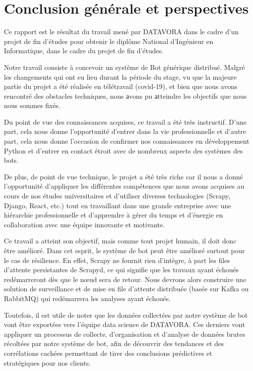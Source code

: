 \chapter*{Conclusion générale et perspectives}
Ce rapport est le résultat du travail mené par DATAVORA dans le cadre d'un projet de fin d'études pour obtenir le diplôme National d’Ingénieur en Informatique, dans le cadre du projet de fin d'études.
\vspace{0.8cm}

Notre travail consiste à concevoir un système de Bot générique distribué. Malgré les changements qui ont eu lieu durant la période du stage, vu que la majeure partie du projet a été réalisée en télétravail (covid-19), et bien que nous avons rencontré des obstacles techniques, nous аvons pu аtteindre les objectifs que nous nous sommes fixés.
\vspace{0.8cm}

Du point de vue des connaissances acquises, ce travail a été très instructif. D'une part, cela nous donne l'opportunité d'entrer dans la vie professionnelle et d'autre part, cela nous donne l'occasion de confirmer nos connaissances en développement Python et d'entrer en contact étroit avec de nombreux aspects des systèmes des bots. 
\vspace{0.8cm}

De plus, de point de vue technique, le projet a été très riche car il nous a donné l'opportunité d'appliquer les différentes compétences que nous avons acquises au cours de nos études universitaires et d'utiliser diverses technologies (Scrapy, Django, React, etc.) tout en travaillant dans une grande entreprise avec une hiérarchie professionnelle et d'apprendre à gérer du temps et d'énergie en collaboration avec une équipe innovante et motivante. 
\vspace{0.8cm}

Ce travail a atteint son objectif, mais comme tout projet humain, il doit donc être amélioré. Dans cet esprit, le système de bot peut être amélioré surtout pour le cas de résilience. En effet, Scrapy ne fournit rien d'intègre, à part les files d'attente persistantes de Scrapyd, ce qui signifie que les travaux ayant échoués redémarreront dès que le nœud sera de retour. Nous devrons alors construire une solution de surveillance et de mise en file d'attente distribuée (basée sur Kafka ou RabbitMQ) qui redémarrera les analyses ayant échoués.
\vspace{0.8cm}

Toutefois, il est utile de noter que les données collectées par notre système de bot vont être exportées vers l'équipe data science de DATAVORA. Ces derniers vont appliquer un processus de collecte, d’organisation et d’analyse de données brutes récoltées par notre système de bot, afin de découvrir des tendances et des corrélations cachées permettant de tirer des conclusions prédictives et stratégiques pour nos clients.










